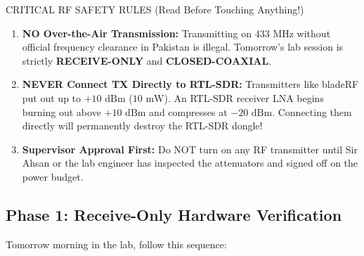 \documentclass[11pt,a4paper]{article}
\begin{document}
\begin{safetybox}{CRITICAL RF SAFETY RULES (Read Before Touching Anything!)}
\begin{enumerate}[leftmargin=*]
    \item \textbf{NO Over-the-Air Transmission:} Transmitting on $433\text{ MHz}$ without official frequency clearance in Pakistan is illegal. Tomorrow's lab session is strictly \textbf{RECEIVE-ONLY} and \textbf{CLOSED-COAXIAL}.
    \item \textbf{NEVER Connect TX Directly to RTL-SDR:} Transmitters like bladeRF put out up to $+10\text{ dBm}$ ($10\text{ mW}$). An RTL-SDR receiver LNA begins burning out above $+10\text{ dBm}$ and compresses at $-20\text{ dBm}$. Connecting them directly will permanently destroy the RTL-SDR dongle!
    \item \textbf{Supervisor Approval First:} Do NOT turn on any RF transmitter until Sir Ahsan or the lab engineer has inspected the attenuators and signed off on the power budget.
\end{enumerate}
\end{safetybox}

\subsection{Phase 1: Receive-Only Hardware Verification}
Tomorrow morning in the lab, follow this sequence:
\end{document}
